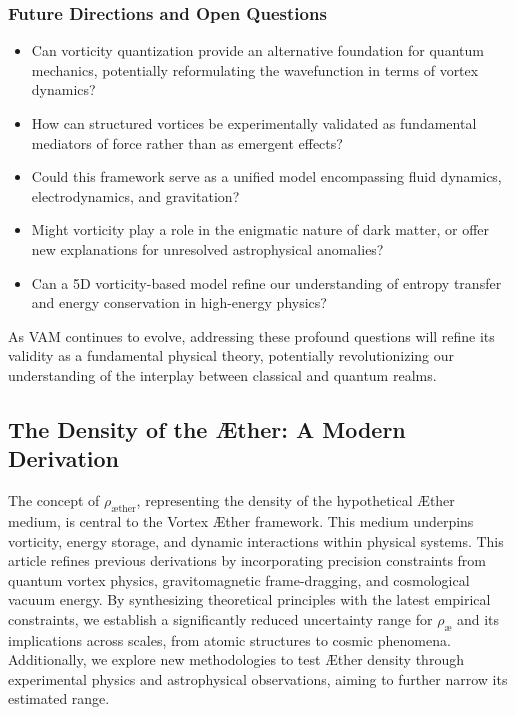 \subsubsection*{Future Directions and Open Questions}
\begin{itemize}
    \item Can vorticity quantization provide an alternative foundation for quantum mechanics, potentially reformulating the wavefunction in terms of vortex dynamics?
    \item How can structured vortices be experimentally validated as fundamental mediators of force rather than as emergent effects?
    \item Could this framework serve as a unified model encompassing fluid dynamics, electrodynamics, and gravitation?
    \item Might vorticity play a role in the enigmatic nature of dark matter, or offer new explanations for unresolved astrophysical anomalies?
    \item Can a 5D vorticity-based model refine our understanding of entropy transfer and energy conservation in high-energy physics?
\end{itemize}

As VAM continues to evolve, addressing these profound questions will refine its validity as a fundamental physical theory, potentially revolutionizing our understanding of the interplay between classical and quantum realms.


\subsection*{The Density of the Æther: A Modern Derivation}
The concept of $\rho_\text{{\ae}{ther}}$, representing the density of the hypothetical Æther medium, is central to the Vortex Æther framework. This medium underpins vorticity, energy storage, and dynamic interactions within physical systems. This article refines previous derivations by incorporating precision constraints from quantum vortex physics, gravitomagnetic frame-dragging, and cosmological vacuum energy. By synthesizing theoretical principles with the latest empirical constraints, we establish a significantly reduced uncertainty range for $\rho_\text{\ae}$ and its implications across scales, from atomic structures to cosmic phenomena. Additionally, we explore new methodologies to test Æther density through experimental physics and astrophysical observations, aiming to further narrow its estimated range.



